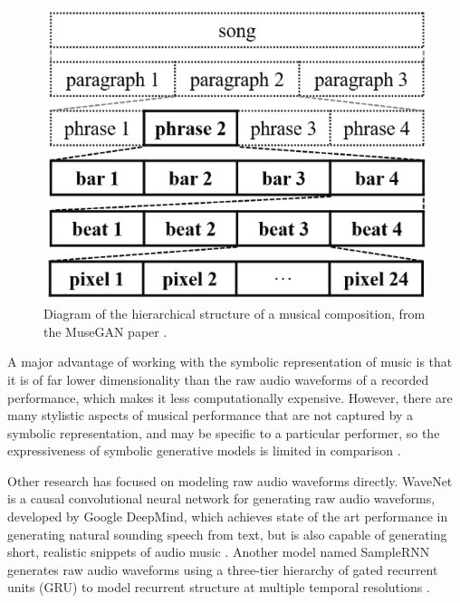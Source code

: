 \documentclass[sigconf,authorversion]{acmart}
\begin{document}
\begin{figure}[h]
  \centering
  \includegraphics[width=\linewidth]{song_structure.png}
  \caption{Diagram of the hierarchical structure of a musical
    composition, from the MuseGAN paper \cite{dong2017musegan}.}
  \label{song_structure}
\end{figure}

A major advantage of working with the symbolic representation of music
is that it is of far lower dimensionality than the raw audio waveforms
of a recorded performance, which makes it less computationally
expensive. However, there are many stylistic aspects of musical
performance that are not captured by a symbolic representation, and
may be specific to a particular performer, so the expressiveness of
symbolic generative models is limited in comparison
\cite{manzelli_conditioning_2018}.

Other research has focused on modeling raw audio waveforms directly. WaveNet is
a causal convolutional neural network for generating raw audio waveforms,
developed by Google DeepMind, which achieves state of the art performance in
generating natural sounding speech from text, but is also capable of generating
short, realistic snippets of audio music \cite{oord_wavenet_2016}.
Another model named SampleRNN generates raw audio waveforms using a three-tier
hierarchy of gated recurrent units (GRU) to model recurrent structure at
multiple temporal resolutions \cite{mehri_samplernn_2017}.
\end{document}
